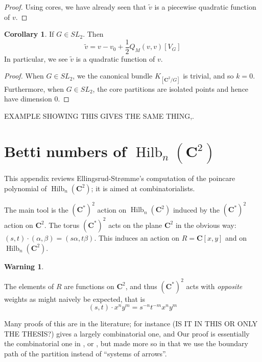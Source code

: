 \documentclass{amsart}[12pt]
\theoremstyle{definition}
\newtheorem{corollary}[dummy]{Corollary}
\newtheorem{warning}[dummy]{Warning}
\newcommand{\C}{\mathbf{C}}
\DeclareMathOperator{\Hilb}{Hilb}
\begin{document}
\begin{proof}
Using cores, we have already seen that $\tilde{v}$ is a piecewise quadratic function of $v$.  
\end{proof}


\begin{corollary}  If $G\in SL_2$. Then
$$\tilde{v}=v-v_0+\frac{1}{2}Q_M(v,v)[V_G]$$
In particular, we see $\tilde{v}$ is a quadratic function of $v$.
\end{corollary}

\begin{proof}
When $G\in SL_2$, we the canonical bundle $K_{[\C^2/G]}$ is trivial, and so $k=0$.  Furthermore, when $G\in SL_2$, the core partitions are isolated points and hence have dimension 0.
\end{proof}


EXAMPLE SHOWING THIS GIVES THE SAME THING,.





\appendix

\section{Betti numbers of $\Hilb_n(\C^2)$}
This appendix reviews Ellingsrud-Str\o mme's computation of the poincare polynomial of $\Hilb_n(\C^2)$; it is aimed at combinatorialists.  

The main tool is the $(\C^*)^2$ action on $\Hilb_n(\C^2)$ induced by the $(\C^*)^2$ action on $\C^2$.  The torus $(\C^*)^2$ acts on the plane $\C^2$ in the obvious way: $(s,t)\cdot (\alpha,\beta)=(s\alpha,t\beta)$.  This induces an action on $R=\C[x,y]$ and on $\Hilb_n(\C^2)$.  

\begin{warning} \label{warning:action-sign}

 The elements of $R$ are functions on $\C^2$, and thus $(\C^*)^2$ acts with \emph{opposite} weights as might naively be expected, that is 
$$(s,t)\cdot x^ny^m=s^{-n}t^{-m}x^ny^m$$
\end{warning}




Many proofs of this are in the literature; for instance \cite{cheah} (IS IT IN THIS OR ONLY THE THESIS?) gives a largely combinatorial one, and \cite{nakajimabook}   Our proof is essentially the combinatorial one in \cite{cheah}, or , but made more so in that we use the boundary path of the partition instead of ``systems of arrows''.  
\end{document}

